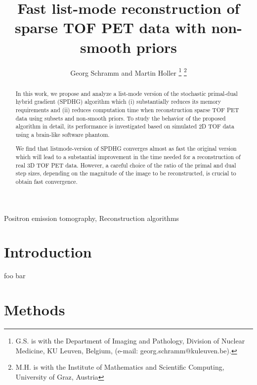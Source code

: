 \documentclass{IEEEtran}
\begin{document}
\title{Fast list-mode reconstruction of sparse TOF PET data with non-smooth priors} 
\author{Georg Schramm and Martin Holler
\thanks{G.S. is with the Department of Imaging and Pathology, Division of Nuclear Medicine,
KU Leuven, Belgium, (e-mail: georg.schramm@kuleuven.be).}
\thanks{M.H. is with the Institute of Mathematics and Scientific Computing, 
University of Graz, Austria}
}

\maketitle

\begin{abstract}
In this work, we propose and analyze a list-mode version of the stochastic primal-dual hybrid gradient
(SPDHG) algorithm which (i) substantially reduces its memory requirements and (ii) reduces
computation time when reconstruction sparse TOF PET data using subsets and non-smooth priors. 
To study the behavior of the proposed algorithm in detail, its performance 
is investigated based on simulated 2D TOF data using a brain-like software phantom.

We find that listmode-version of SPDHG converges almost as fast the original version
which will lead to a substantial improvement in the time needed for a reconstruction
of real 3D TOF PET data.
However, a careful choice of the ratio of the primal and dual step sizes, 
depending on the magnitude of the image to be reconstructed, is crucial to obtain fast convergence.
\end{abstract}

\begin{IEEEkeywords}
Positron emission tomography, Reconstruction algorithms
\end{IEEEkeywords}

\section{Introduction}
foo bar

\section{Methods}
\end{document}
